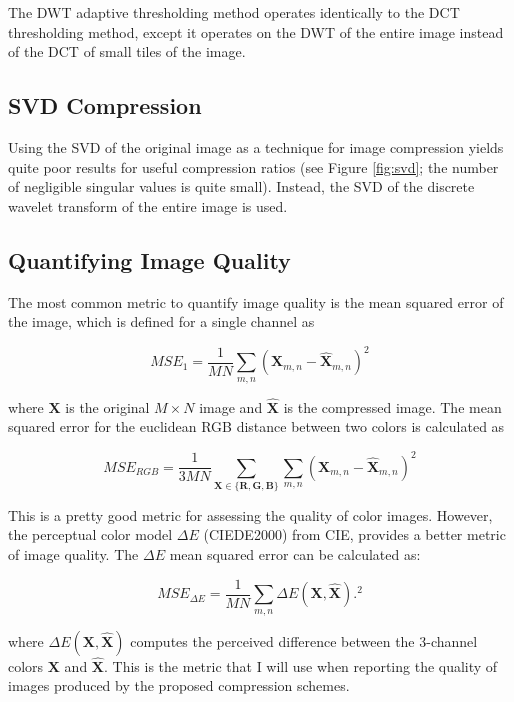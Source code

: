 \documentclass[conference]{IEEEtran}
\begin{document}
The DWT adaptive thresholding method operates identically to the DCT thresholding method, except it operates on the DWT of the entire image instead of the DCT of small tiles of the image.

\subsection{SVD Compression}
Using the SVD of the original image as a technique for image compression yields quite poor results for useful compression ratios (see Figure \ref{fig:svd}; the number of negligible singular values is quite small).
Instead, the SVD of the discrete wavelet transform of the entire image is used.

\subsection{Quantifying Image Quality}

The most common metric to quantify image quality is the mean squared error of the image, which is defined for a single channel as

\begin{equation}
    MSE_{1} = \frac{1}{MN}\sum_{m,n}\left(\mathbf{X}_{m,n} - \mathbf{\hat{X}}_{m,n}\right)^2
\end{equation}

where $\mathbf{X}$ is the original $M\times N$ image and $\mathbf{\hat{X}}$ is the compressed image.
The mean squared error for the euclidean RGB distance between two colors is calculated as

\begin{equation}
    MSE_{RGB} = \frac{1}{3MN}\sum_{\mathbf{X}\in\{\mathbf{R},\mathbf{G},\mathbf{B}\}}\sum_{m,n}\left(\mathbf{X}_{m,n} - \mathbf{\hat{X}}_{m,n}\right)^2
\end{equation}

This is a pretty good metric for assessing the quality of color images.
However, the perceptual color model $\Delta E$ (CIEDE2000) from CIE, provides a better metric of image quality.
The $\Delta E$ mean squared error can be calculated as:

\begin{equation}
    MSE_{\Delta E} = \frac{1}{MN}\sum_{m,n}\Delta E\left(\mathbf{X}, \mathbf{\hat{X}}\right).^2
\end{equation}

where $\Delta E(\mathbf{X}, \mathbf{\hat{X}})$ computes the perceived difference between the 3-channel colors $\mathbf{X}$ and $\mathbf{\hat{X}}$.
This is the metric that I will use when reporting the quality of images produced by the proposed compression schemes.
\end{document}
